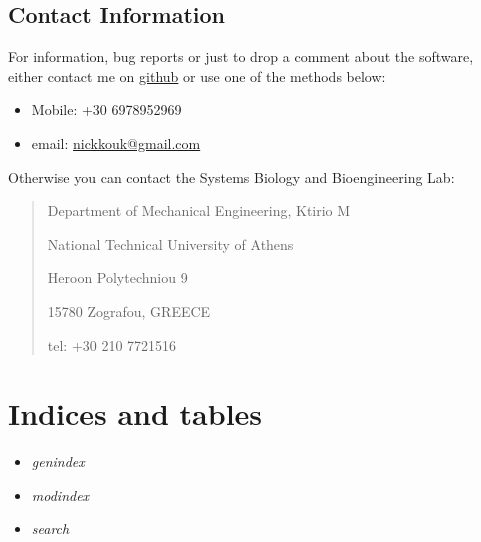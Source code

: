 \documentclass[letterpaper,10pt,english]{sphinxmanual}
\begin{document}
\section{Contact Information}
\label{contact-info::doc}\label{contact-info:contact-information}
For information, bug reports or just to drop a comment about the software,
either contact me on \href{https://github.com/bergercookie}{github}
or use one of the methods below:
\begin{itemize}
\item {} 
Mobile: +30 6978952969

\item {} 
email: \href{mailto:nickkouk@gmail.com}{nickkouk@gmail.com}

\end{itemize}

Otherwise you can contact the Systems Biology and Bioengineering Lab:
\begin{quote}

\begin{DUlineblock}{0em}
\item[] Department of Mechanical Engineering, Ktirio M
\item[] National Technical University of Athens
\item[] Heroon Polytechniou 9
\item[] 15780 Zografou, GREECE
\item[] tel: +30 210 7721516
\end{DUlineblock}
\end{quote}


\chapter{Indices and tables}
\label{index:indices-and-tables}\begin{itemize}
\item {} 
\emph{genindex}

\item {} 
\emph{modindex}

\item {} 
\emph{search}

\end{itemize}



\renewcommand{\indexname}{Index}
\printindex
\end{document}

